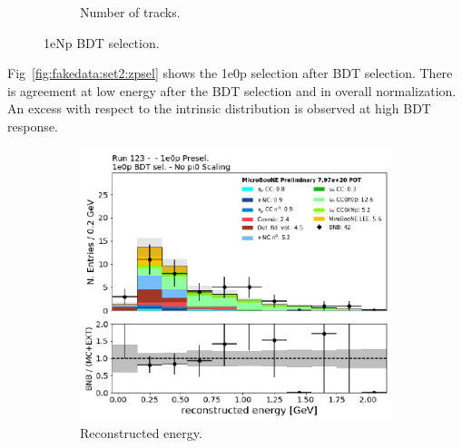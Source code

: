 \begin{figure}[H]
\begin{center}
\begin{subfigure}[b]{0.45\textwidth}
    \caption{\label{fig:fakedata:set2:Np_postsel_ntracks} Number of tracks.}
    \end{subfigure}
\caption{\label{fig:fakedata:set2:npsel} 1eNp BDT selection.}
\end{center}
\end{figure}

Fig~\ref{fig:fakedata:set2:zpsel} shows the 1e0p selection after BDT selection.  There is agreement at low energy after the BDT selection and in overall normalization. An excess with respect to the \nue intrinsic distribution is observed at high BDT response.

\begin{figure}[H] 
\begin{center}
    \begin{subfigure}[b]{0.3\textwidth}
    \centering
    \includegraphics[width=1.00\textwidth]{Fakedata/set2/zp_postsel_recoe.pdf}
    \caption{\label{fig:fakedata:set2:zp_postsel_recoe} Reconstructed energy.}
    \end{subfigure}
    \begin{subfigure}[b]{0.3\textwidth}
    \centering

\end{subfigure}
\end{center}
\end{figure}
